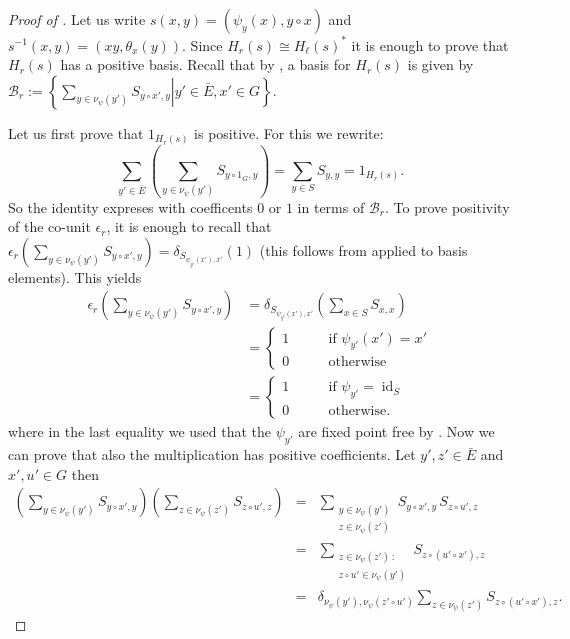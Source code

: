 \documentclass[a4paper,10pt]{amsart}
\theoremstyle{definition}
\theoremstyle{remark}
\DeclareMathOperator{\id}{id}
\newcommand\mc{\mathcal}
\begin{document}
\begin{proof}[Proof of ]

Let us write $s(x,y)=(\psi_y(x),y\circ x)$ and $s^{-1}(x,y)= (xy, \theta_x(y))$. Since $H_r(s) \cong H_{\ell}(s)^*$ it is enough to prove that $H_r(s)$ has a positive basis. Recall that by , a basis for $H_r(s)$ is given by $\mc{B}_r := \left\{\left.\sum_{y\in \nu_{\psi}(y')}S_{y\circ x',y}\right| y'\in \bar{E}, x' \in G\right\}$. 

Let us first prove that $1_{H_r(s)}$ is positive. For this we rewrite: 
\begin{equation}\label{id positive}
\sum_{y'\in \bar{E}}\left( \sum_{y\in\nu_{\psi}(y')}S_{y\circ 1_G,y}\right) = \sum_{y\in S}S_{y,y} = 1_{H_r(s)}.
\end{equation}
So the identity expreses with coefficents $0$ or $1$ in terms of $\mc{B}_r$. To prove positivity of the co-unit $\epsilon_r$, it is enough to recall that $\epsilon_r(\sum_{y\in \nu_{\psi}(y')}S_{y\circ x',y}) = \delta_{S_{\psi_{y'}(x'),x'}}(1)$ (this follows from  applied to basis elements). This yields 
\begin{align*}
\epsilon_r\left(\sum_{y\in \nu_{\psi}(y')}S_{y\circ x',y}\right) &= \delta_{S_{\psi_{y'}(x'),x'}} \left(\sum_{x\in S}S_{x,x} \right)\\
&=\begin{cases}
    1 \qquad &\text{if } \psi_{y'}(x') = x'\\
    0&\text{otherwise}
\end{cases}\\
 &= \begin{cases}
    1 \qquad &\text{if } \psi_{y'}= \id_S\\
    0&\text{otherwise}.
\end{cases}
\end{align*}
where in the last equality we used that the $\psi_{y'}$ are fixed point free by .
Now we can prove that also the multiplication has positive coefficients.
Let $y', z' \in \bar{E}$ and $x',u' \in G$ then 
\begin{equation}\label{pos mult}
\begin{array}{lcl}
    \left(\sum_{y\in \nu_{\psi}(y')}S_{y\circ x',y}\right)\left(\sum_{z\in \nu_{\psi}(z')}S_{z\circ u',z}\right)
    &= & \sum\limits_{\substack{y\in \nu_{\psi}(y')\\ z\in\nu_{\psi}(z')}}S_{y\circ x', y}\,S_{z\circ u',z} \\
    &= & \sum\limits_{\substack{z\in\nu_{\psi}(z')\, : \, \\ z\circ u' \in \nu_{\psi}(y')}}S_{z\circ (u'\circ x'),z}\\
    &=  &\delta_{\nu_{\psi}(y'), \nu_{\psi}(z'\circ u')}\sum\limits_{z\in\nu_{\psi}(z')}S_{z\circ (u'\circ x'),z}.
\end{array}
\end{equation}



\end{proof}
\end{document}
